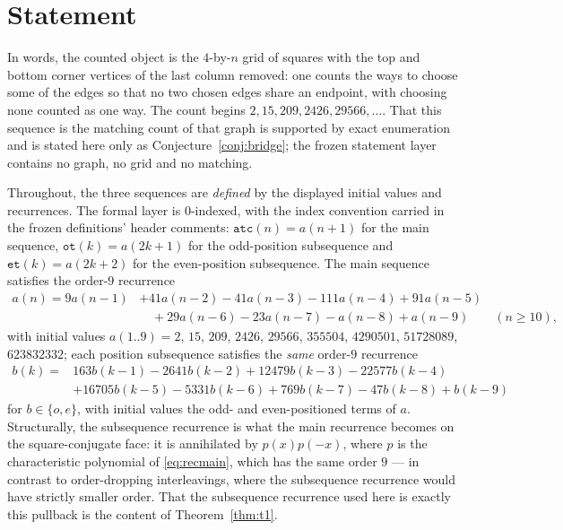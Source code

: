 \documentclass[11pt]{article}
\theoremstyle{definition}
\begin{document}
\section{Statement}\label{sec:statement}

In words, the counted object is the $4$-by-$n$ grid of squares with the top and
bottom corner vertices of the last column removed: one counts the ways to choose
some of the edges so that no two chosen edges share an endpoint, with choosing
none counted as one way. The count begins $2, 15, 209, 2426, 29566, \dots$.
That this sequence is the matching count of that graph is supported by exact
enumeration and is stated here only as Conjecture~\ref{conj:bridge}; the frozen
statement layer contains no graph, no grid and no matching.

Throughout, the three sequences are \emph{defined} by the displayed initial
values and recurrences. The formal layer is $0$-indexed, with the index
convention carried in the frozen definitions' header comments:
$\texttt{atc}(n) = a(n+1)$ for the main sequence, $\texttt{ot}(k) = a(2k+1)$
for the odd-position subsequence and $\texttt{et}(k) = a(2k+2)$ for the
even-position subsequence. The main sequence satisfies the order-$9$ recurrence
\begin{align}
  a(n) = 9a(n-1) &+ 41a(n-2) - 41a(n-3) - 111a(n-4) + 91a(n-5)
  \nonumber\\&\quad + 29a(n-6) - 23a(n-7) - a(n-8) + a(n-9)
  \qquad (n \ge 10),
  \label{eq:recmain}
\end{align}
with initial values $a(1..9) = 2$, $15$, $209$, $2426$, $29566$, $355504$,
$4290501$, $51728089$, $623832332$; each position subsequence satisfies the
\emph{same} order-$9$ recurrence
\begin{equation}\label{eq:recsub}
  \begin{aligned}
    b(k) = {}& 163b(k-1) - 2641b(k-2) + 12479b(k-3) - 22577b(k-4)\\
      & + 16705b(k-5) - 5331b(k-6) + 769b(k-7) - 47b(k-8) + b(k-9)
  \end{aligned}
\end{equation}
for $b \in \{o, e\}$, with initial values the odd- and even-positioned terms of
$a$. Structurally, the subsequence recurrence is what the main recurrence
becomes on the square-conjugate face: it is annihilated by $p(x)p(-x)$, where
$p$ is the characteristic polynomial of \eqref{eq:recmain}, which has the same
order $9$ --- in contrast to order-dropping interleavings, where the subsequence
recurrence would have strictly smaller order. That the subsequence recurrence
used here is exactly this pullback is the content of Theorem~\ref{thm:t1}.
\end{document}
